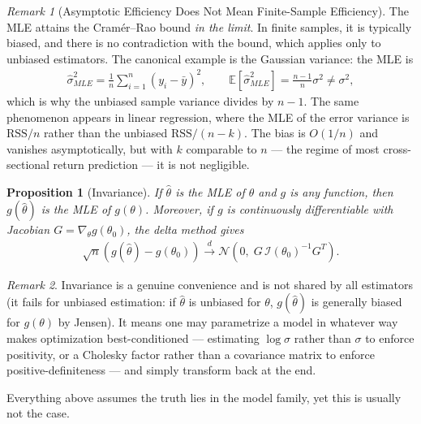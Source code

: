 \documentclass[11pt]{article}
\theoremstyle{definition}
\theoremstyle{plain}
\newtheorem{proposition}{Proposition}[section]
\theoremstyle{remark}
\newtheorem{remark}{Remark}[section]
\begin{document}
\begin{remark}[Asymptotic Efficiency Does Not Mean Finite-Sample Efficiency]
    The MLE attains the Cramér--Rao bound \emph{in the limit}. In finite samples, it is typically biased, and there is no contradiction with the bound, which applies only to unbiased estimators. The canonical example is the Gaussian variance: the MLE is
    \begin{align}
        \hat{\sigma}^2_{MLE} = \frac{1}{n}\sum_{i=1}^n (y_i - \bar{y})^2, \qquad \mathbb{E}[\hat{\sigma}^2_{MLE}] = \frac{n-1}{n}\sigma^2 \neq \sigma^2,
    \end{align}
    which is why the unbiased sample variance divides by $n-1$. The same phenomenon appears in linear regression, where the MLE of the error variance is $\mathrm{RSS}/n$ rather than the unbiased $\mathrm{RSS}/(n-k)$. The bias is $O(1/n)$ and vanishes asymptotically, but with $k$ comparable to $n$ --- the regime of most cross-sectional return prediction --- it is not negligible.
\end{remark}

\begin{proposition}[Invariance]
    If $\hat{\theta}$ is the MLE of $\theta$ and $g$ is any function, then $g(\hat{\theta})$ is the MLE of $g(\theta)$. Moreover, if $g$ is continuously differentiable with Jacobian $G = \nabla_\theta g(\theta_0)$, the delta method gives
    \begin{align}
        \sqrt{n}\left(g(\hat{\theta}) - g(\theta_0)\right) \xrightarrow{d} \mathcal{N}\!\left(0,\; G\,\mathcal{I}(\theta_0)^{-1}G^T\right).
    \end{align}
\end{proposition}

\begin{remark}
    Invariance is a genuine convenience and is not shared by all estimators (it fails for unbiased estimation: if $\hat{\theta}$ is unbiased for $\theta$, $g(\hat{\theta})$ is generally biased for $g(\theta)$ by Jensen). It means one may parametrize a model in whatever way makes optimization best-conditioned --- estimating $\log\sigma$ rather than $\sigma$ to enforce positivity, or a Cholesky factor rather than a covariance matrix to enforce positive-definiteness --- and simply transform back at the end.
\end{remark}

Everything above assumes the truth lies in the model family, yet this is usually not the case.
\end{document}
